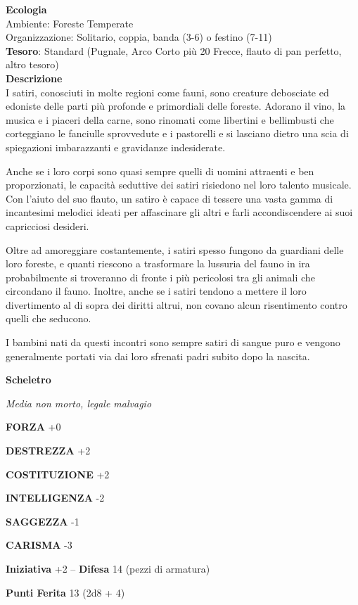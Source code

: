 \begin{multicols}{2}
\textbf{Ecologia}\\
Ambiente: Foreste Temperate\\
Organizzazione: Solitario, coppia, banda (3-6) o festino (7-11)\\
\textbf{Tesoro}: Standard (Pugnale, Arco Corto più 20 Frecce, flauto di pan perfetto, altro tesoro)\\
\textbf{Descrizione}\\
I satiri, conosciuti in molte regioni come fauni, sono creature debosciate ed edoniste delle parti più profonde e primordiali delle foreste. Adorano il vino, la musica e i piaceri della carne, sono rinomati come libertini e bellimbusti che corteggiano le fanciulle sprovvedute e i pastorelli e si lasciano dietro una scia di spiegazioni imbarazzanti e gravidanze indesiderate.

Anche se i loro corpi sono quasi sempre quelli di uomini attraenti e ben proporzionati, le capacità seduttive dei satiri risiedono nel loro talento musicale. Con l'aiuto del suo flauto, un satiro è capace di tessere una vasta gamma di incantesimi melodici ideati per affascinare gli altri e farli accondiscendere ai suoi capricciosi desideri.

Oltre ad amoreggiare costantemente, i satiri spesso fungono da guardiani delle loro foreste, e quanti riescono a trasformare la lussuria del fauno in ira probabilmente si troveranno di fronte i più pericolosi tra gli animali che circondano il fauno. Inoltre, anche se i satiri tendono a mettere il loro divertimento al di sopra dei diritti altrui, non covano alcun risentimento contro quelli che seducono.

I bambini nati da questi incontri sono sempre satiri di sangue puro e vengono generalmente portati via dai loro sfrenati padri subito dopo la nascita.


\medskip{}\textbf{Scheletro}

\textit{Media non morto, legale malvagio}

\textbf{FORZA} +0

\textbf{DESTREZZA} +2

\textbf{COSTITUZIONE} +2

\textbf{INTELLIGENZA} -2

\textbf{SAGGEZZA} -1

\textbf{CARISMA} -3

\textbf{Iniziativa} +2 -- \textbf{Difesa} 14 (pezzi di armatura)

\textbf{Punti Ferita} 13 (2d8 + 4)


\end{multicols}
